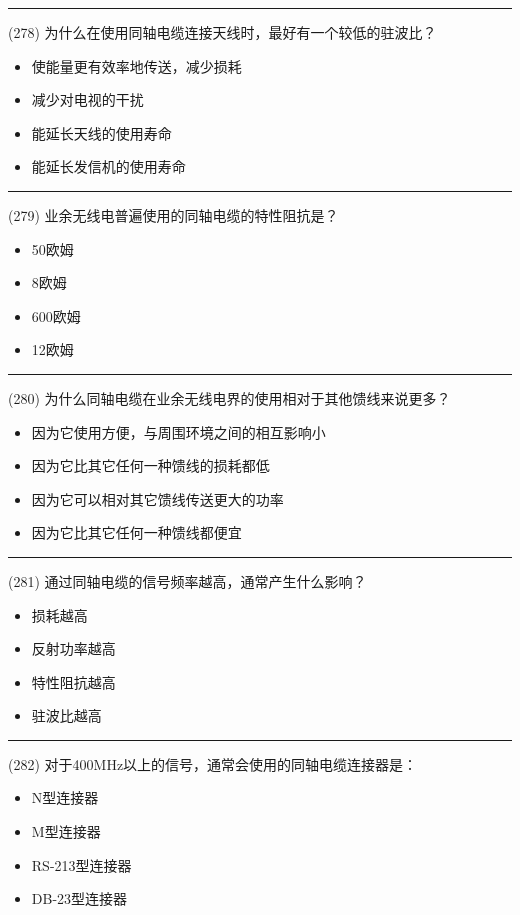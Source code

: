 \documentclass[twocolumn]{ctexart}  %
\begin{document}
\noindent\rule{0.5\textwidth}{1pt}
\heiti (278) 为什么在使用同轴电缆连接天线时，最好有一个较低的驻波比？ \songti {\color{gray} [LK1217] }
\begin{itemize}
	\item  使能量更有效率地传送，减少损耗
	\item  减少对电视的干扰
	\item  能延长天线的使用寿命
	\item  能延长发信机的使用寿命
\end{itemize}


\noindent\rule{0.5\textwidth}{1pt}
\heiti (279) 业余无线电普遍使用的同轴电缆的特性阻抗是？ \songti {\color{gray} [LK1218] }
\begin{itemize}
	\item  50欧姆
	\item  8欧姆
	\item  600欧姆
	\item  12欧姆
\end{itemize}


\noindent\rule{0.5\textwidth}{1pt}
\heiti (280) 为什么同轴电缆在业余无线电界的使用相对于其他馈线来说更多？ \songti {\color{gray} [LK1219] }
\begin{itemize}
	\item  因为它使用方便，与周围环境之间的相互影响小
	\item  因为它比其它任何一种馈线的损耗都低
	\item  因为它可以相对其它馈线传送更大的功率
	\item  因为它比其它任何一种馈线都便宜
\end{itemize}


\noindent\rule{0.5\textwidth}{1pt}
\heiti (281) 通过同轴电缆的信号频率越高，通常产生什么影响？ \songti {\color{gray} [LK1221] }
\begin{itemize}
	\item  损耗越高
	\item  反射功率越高
	\item  特性阻抗越高
	\item  驻波比越高
\end{itemize}


\noindent\rule{0.5\textwidth}{1pt}
\heiti (282) 对于400MHz以上的信号，通常会使用的同轴电缆连接器是： \songti {\color{gray} [LK1222] }
\begin{itemize}
	\item  N型连接器
	\item  M型连接器
	\item  RS-213型连接器
	\item  DB-23型连接器
\end{itemize}
\end{document}

